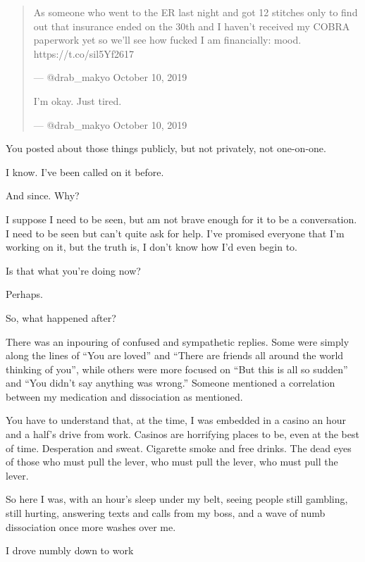 \begin{quotation}
As someone who went to the ER last night and got 12 stitches only to find out that insurance ended on the 30th and I haven't received my COBRA paperwork yet so we'll see how fucked I am financially: mood. https://t.co/sil5Yf2617

--- @drab\_makyo October 10, 2019

I'm okay. Just tired.

--- @drab\_makyo October 10, 2019
\end{quotation}
\newpage

\begin{ally}
You posted about those things publicly, but not privately, not one-on-one.
\end{ally}
I know. I've been called on it before.

\begin{ally}
And since. Why?
\end{ally}
I suppose I need to be seen, but am not brave enough for it to be a conversation. I need to be seen but can't quite ask for help. I've promised everyone that I'm working on it, but the truth is, I don't know how I'd even begin to.

\begin{ally}
Is that what you're doing now?
\end{ally}
Perhaps.
\newpage

\begin{ally}
So, what happened after?
\end{ally}
There was an inpouring of confused and sympathetic replies. Some were simply along the lines of ``You are loved'' and ``There are friends all around the world thinking of you'', while others were more focused on ``But this is all so sudden'' and ``You didn't say anything was wrong.'' Someone mentioned a correlation between my medication and dissociation as mentioned.

You have to understand that, at the time, I was embedded in a casino an hour and a half's drive from work. Casinos are horrifying places to be, even at the best of time. Desperation and sweat. Cigarette smoke and free drinks. The dead eyes of those who must pull the lever, who must pull the lever, who must pull the lever.

So here I was, with an hour's sleep under my belt, seeing people still gambling, still hurting, answering texts and calls from my boss, and a wave of numb dissociation once more washes over me.

I drove numbly down to work

